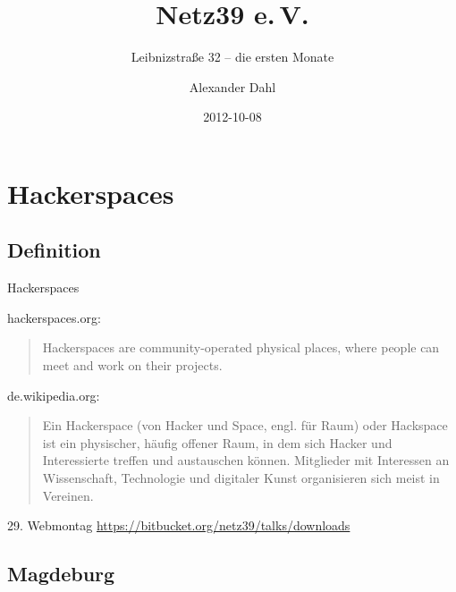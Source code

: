 \documentclass[hyperref={pdfpagelabels=false}]{beamer}
\title[Netz39 e.\,V.]{Netz39 e.\,V.}
\subtitle{Leibnizstraße 32 -- die ersten Monate}
\author{Alexander Dahl}
\institute[netz39.de]{\url{http://www.netz39.de/}}
\date{2012-10-08}
\begin{document}
\begin{frame}
	\titlepage
\end{frame}


\section{Hackerspaces}

\subsection{Definition}

\begin{frame}{Hackerspaces}
    \begin{block}{hackerspaces.org:}
        \begin{quote}
            Hackerspaces are community-operated physical places, where
            people can meet and work on their projects.
        \end{quote}
    \end{block}
    \pause
    \begin{block}{de.wikipedia.org:}
        \begin{quote}
            Ein Hackerspace (von Hacker und Space, engl. für Raum) oder
            Hackspace ist ein physischer, häufig offener Raum, in dem
            sich Hacker und Interessierte treffen und austauschen
            können. Mitglieder mit Interessen an Wissenschaft,
            Technologie und digitaler Kunst organisieren sich meist in
            Vereinen.
        \end{quote}
    \end{block}
    \pause
    \begin{block}{29. Webmontag}
        \url{https://bitbucket.org/netz39/talks/downloads}
    \end{block}
\end{frame}

\subsection{Magdeburg}
\end{document}
